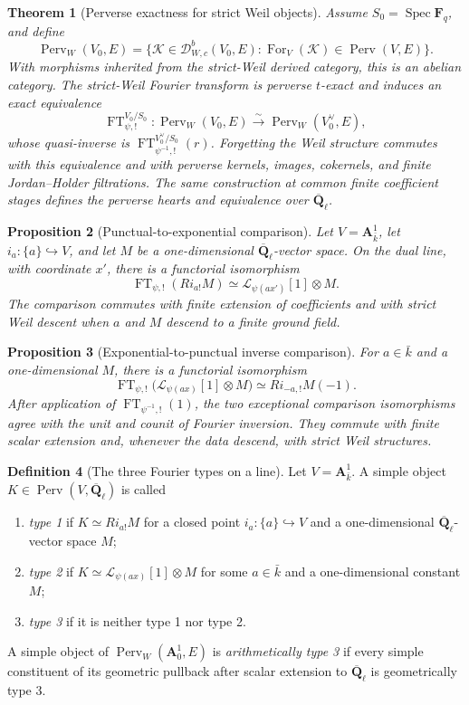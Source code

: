 \documentclass[10pt]{article}
\newtheorem{theorem}{Theorem}[section]
\newtheorem{proposition}[theorem]{Proposition}
\theoremstyle{definition}
\newtheorem{definition}[theorem]{Definition}
\newcommand{\Fq}{\mathbf F_q}
\newcommand{\Qlb}{\overline{\mathbf Q}_\ell}
\newcommand{\Aone}{\mathbf A^1}
\newcommand{\FT}{\operatorname{FT}}
\newcommand{\Spec}{\operatorname{Spec}}
\newcommand{\Perv}{\operatorname{Perv}}
\begin{document}
\begin{theorem}[Perverse exactness for strict Weil objects]
Assume \(S_0=\Spec\Fq\), and define
\[
 \Perv_W(V_0,E)=
 \{\mathcal K\in\mathcal D^b_{W,c}(V_0,E):
   \operatorname{For}_V(\mathcal K)\in\Perv(V,E)\}.
\]
With morphisms inherited from the strict-Weil derived category, this is an
abelian category.  The strict-Weil Fourier transform is perverse
\(t\)-exact and induces an exact equivalence
\[
 \FT^{V_0/S_0}_{\psi,!}:\Perv_W(V_0,E)
 \xrightarrow{\sim}\Perv_W(V_0^\vee,E),
\]
whose quasi-inverse is
\(\FT^{V_0^\vee/S_0}_{\psi^{-1},!}(r)\).  Forgetting the Weil structure
commutes with this equivalence and with perverse kernels, images, cokernels,
and finite Jordan--Holder filtrations.  The same construction at common
finite coefficient stages defines the perverse hearts and equivalence over
\(\Qlb\).
\end{theorem}

\begin{proposition}[Punctual-to-exponential comparison]
Let \(V=\Aone_{\bar k}\), let \(i_a:\{a\}\hookrightarrow V\), and let
\(M\) be a one-dimensional \(\Qlb\)-vector space.  On the dual line, with
coordinate \(x'\), there is a functorial isomorphism
\[
 \FT_{\psi,!}(Ri_{a!}M)
 \simeq\mathcal L_{\psi(ax')}[1]\otimes M.
\]
The comparison commutes with finite extension of coefficients and with
strict Weil descent when \(a\) and \(M\) descend to a finite ground field.
\end{proposition}

\begin{proposition}[Exponential-to-punctual inverse comparison]
For \(a\in\bar k\) and a one-dimensional \(M\), there is a functorial
isomorphism
\[
 \FT_{\psi,!}\bigl(\mathcal L_{\psi(ax)}[1]\otimes M\bigr)
 \simeq Ri_{-a,!}M(-1).
\]
After application of \(\FT_{\psi^{-1},!}(1)\), the two exceptional
comparison isomorphisms agree with the unit and counit of Fourier inversion.
They commute with finite scalar extension and, whenever the data descend,
with strict Weil structures.
\end{proposition}

\begin{definition}[The three Fourier types on a line]
Let \(V=\Aone_{\bar k}\).  A simple object \(K\in\Perv(V,\Qlb)\) is
called
\begin{enumerate}
\item \emph{type 1} if \(K\simeq Ri_{a!}M\) for a closed point
      \(i_a:\{a\}\hookrightarrow V\) and a one-dimensional
      \(\Qlb\)-vector space \(M\);
\item \emph{type 2} if
      \(K\simeq\mathcal L_{\psi(ax)}[1]\otimes M\) for some
      \(a\in\bar k\) and a one-dimensional constant \(M\);
\item \emph{type 3} if it is neither type 1 nor type 2.
\end{enumerate}
A simple object of \(\Perv_W(\Aone_0,E)\) is \emph{arithmetically type 3}
if every simple constituent of its geometric pullback after scalar
extension to \(\Qlb\) is geometrically type 3.
\end{definition}
\end{document}
